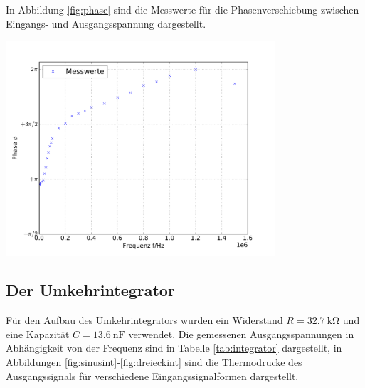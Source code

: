 \documentclass[]{scrartcl}
\begin{document}
In Abbildung \ref{fig:phase} sind die Messwerte für die Phasenverschiebung zwischen Eingangs- und Ausgangsspannung dargestellt.
\begin{center}
	\includegraphics[width=10cm]{images/phase_frequenz.pdf}
	\label{fig:phase}
\end{center}

\subsection{Der Umkehrintegrator}
Für den Aufbau des Umkehrintegrators wurden ein Widerstand $R=\SI{32.7}{\kilo\ohm}$ und eine Kapazität $C=\SI{13.6}{\nano\farad}$ verwendet. Die gemessenen Ausgangsspannungen in Abhängigkeit von der Frequenz sind in Tabelle \ref{tab:integrator} dargestellt, in Abbildungen \ref{fig:sinusint}-\ref{fig:dreieckint} sind die Thermodrucke des Ausgangssignals für verschiedene Eingangssignalformen dargestellt.
\end{document}
